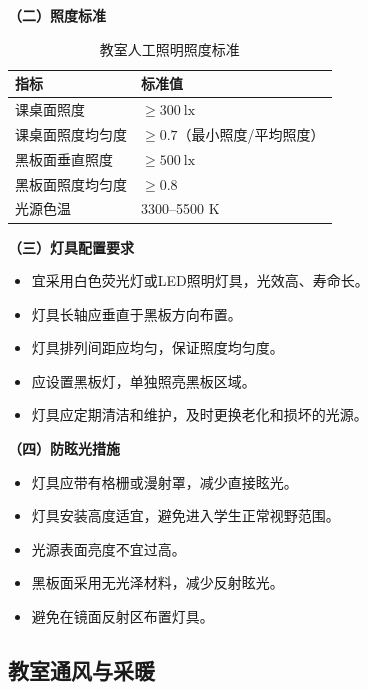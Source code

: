 \begin{keybox}
\textbf{（二）照度标准\difficulty}

\begin{table}[H]
\centering
\caption{教室人工照明照度标准}
\begin{tabularx}{\textwidth}{lX}
\hline
\textbf{指标} & \textbf{标准值} \\
\hline
课桌面照度 & $\geq 300\ \mathrm{lx}$ \\
课桌面照度均匀度 & $\geq 0.7$（最小照度/平均照度） \\
黑板面垂直照度 & $\geq 500\ \mathrm{lx}$ \\
黑板面照度均匀度 & $\geq 0.8$ \\
光源色温 & 3300--5500 K \\
\hline
\end{tabularx}
\end{table}

\textbf{（三）灯具配置要求}

\begin{itemize}[leftmargin=*]
    \item 宜采用白色荧光灯或LED照明灯具，光效高、寿命长。
    \item 灯具长轴应垂直于黑板方向布置。
    \item 灯具排列间距应均匀，保证照度均匀度。
    \item 应设置黑板灯，单独照亮黑板区域。
    \item 灯具应定期清洁和维护，及时更换老化和损坏的光源。
\end{itemize}

\textbf{（四）防眩光措施}

\begin{itemize}[leftmargin=*]
    \item 灯具应带有格栅或漫射罩，减少直接眩光。
    \item 灯具安装高度适宜，避免进入学生正常视野范围。
    \item 光源表面亮度不宜过高。
    \item 黑板面采用无光泽材料，减少反射眩光。
    \item 避免在镜面反射区布置灯具。
\end{itemize}
\end{keybox}

\subsection{教室通风与采暖}


